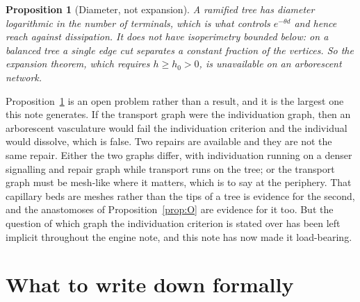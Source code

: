 \documentclass[11pt]{article}
\theoremstyle{plain}
\newtheorem{proposition}[theorem]{Proposition}
\theoremstyle{definition}
\begin{document}
\begin{proposition}[Diameter, not expansion]
\label{prop:Q}
A ramified tree has diameter logarithmic in the number of terminals, which is what controls
$e^{-\theta d}$ and hence reach against dissipation. It does \emph{not} have isoperimetry bounded
below: on a balanced tree a single edge cut separates a constant fraction of the vertices. So the
expansion theorem, which requires $h \geq h_0 > 0$, is unavailable on an arborescent network.
\end{proposition}

Proposition~\ref{prop:Q} is an open problem rather than a result, and it is the largest one this note
generates. If the transport graph were the individuation graph, then an arborescent vasculature would
fail the individuation criterion and the individual would dissolve, which is false. Two repairs are
available and they are not the same repair. Either the two graphs differ, with individuation running
on a denser signalling and repair graph while transport runs on the tree; or the transport graph must
be mesh-like where it matters, which is to say at the periphery. That capillary beds are meshes rather
than the tips of a tree is evidence for the second, and the anastomoses of Proposition~\ref{prop:O}
are evidence for it too. But the question of which graph the individuation criterion is stated over
has been left implicit throughout the engine note, and this note has now made it load-bearing.

\section{What to write down formally}
\label{sec:formal}
\end{document}
